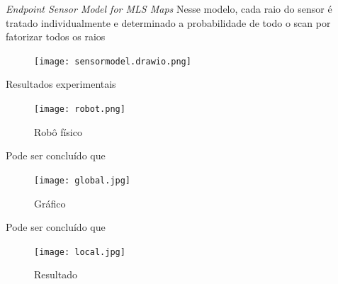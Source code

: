 \begin{frame}[c]{\textit{Endpoint Sensor Model for MLS Maps}}
    Nesse modelo, cada raio do sensor é tratado individualmente e determinado a probabilidade de todo o scan por fatorizar todos os raios
    \newline

    \begin{center}
        \begin{figure}
            \texttt{[image: sensormodel.drawio.png]}
        \end{figure}
    \end{center}


\end{frame}

\begin{frame}[c]{Resultados experimentais}
    \begin{figure}
        \texttt{[image: robot.png]}
       
          
        \caption{Robô físico \cite{article}}
    \end{figure}
\end{frame}

\begin{frame}[c]{Pode ser concluído que}
    \begin{center}
        \begin{figure}
                \texttt{[image: global.jpg]}
                \caption{Gráfico \cite{article}}
            \end{figure}
    \end{center}
\end{frame}

\begin{frame}[c]{Pode ser concluído que}
    \begin{center}
        \begin{figure}
                \texttt{[image: local.jpg]}
                \caption{Resultado \cite{article}}
            \end{figure}
    \end{center}
\end{frame}